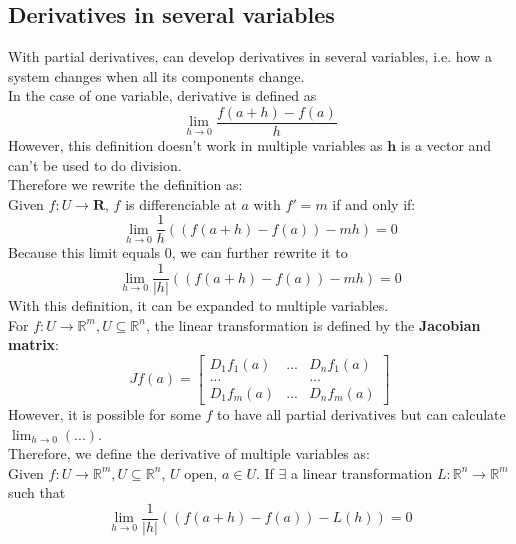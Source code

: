 \documentclass{article}
\begin{document}
\subsection{Derivatives in several variables}
With partial derivatives, can develop derivatives in several variables, i.e. how a system changes when all its components change.\\
In the case of one variable, derivative is defined as
\begin{equation*}
    \lim_{h\rightarrow 0}\frac{f(a+h)-f(a)}{h}
\end{equation*}
However, this definition doesn't work in multiple variables as $\mathbf{h}$ is a vector and can't be used to do division.\\
Therefore we rewrite the definition as:\\
Given $f: U \rightarrow \mathbf{R}$, $f$ is differenciable at $a$ with $f' = m$ if and only if:
\begin{equation*}
    \lim_{h\rightarrow 0} \frac{1}{h}((f(a+h)-f(a)) - mh) = 0
\end{equation*}
Because this limit equals $0$, we can further rewrite it to
\begin{equation*}
    \lim_{h\rightarrow 0} \frac{1}{|h|}((f(a+h)-f(a)) - mh) = 0
\end{equation*}
With this definition, it can be expanded to multiple variables.\\
For $f: U \rightarrow \mathbb{R}^m, U \subseteq \mathbb{R}^n$, the linear transformation is defined by the \textbf{Jacobian matrix}:
\begin{equation*}
    Jf(a) = \begin{bmatrix}
        D_1f_1(a)& ...& D_nf_1(a)\\
        ...&&...\\
        D_1f_m(a)& ...& D_nf_m(a)
    \end{bmatrix}
\end{equation*}
However, it is possible for some $f$ to have all partial derivatives but can calculate $\lim_{h\rightarrow 0}(...)$.\\
Therefore, we define the derivative of multiple variables as:\\
Given $f: U \rightarrow \mathbb{R}^m, U \subseteq \mathbb{R}^n$, $U$ open, $a \in U$. If $\exists$ a linear transformation $L: \mathbb{R}^n \rightarrow \mathbb{R}^m$ such that
\begin{equation*}
    \lim_{h\rightarrow 0}\frac{1}{|h|}((f(a+h)-f(a)) - L(h)) = 0
\end{equation*}
\end{document}
